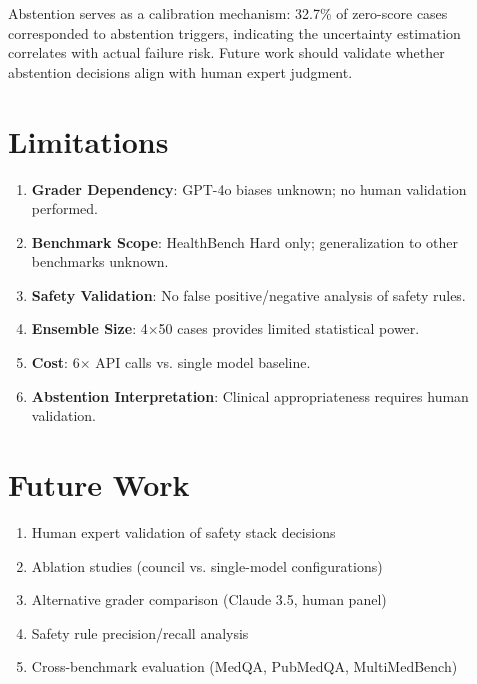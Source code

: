 \documentclass[10pt,twocolumn]{article}
\begin{document}
Abstention serves as a calibration mechanism: 32.7\% of zero-score cases corresponded to abstention triggers, indicating the uncertainty estimation correlates with actual failure risk. Future work should validate whether abstention decisions align with human expert judgment.

\section{Limitations}

\begin{enumerate}
  \item \textbf{Grader Dependency}: GPT-4o biases unknown; no human validation performed.
  \item \textbf{Benchmark Scope}: HealthBench Hard only; generalization to other benchmarks unknown.
  \item \textbf{Safety Validation}: No false positive/negative analysis of safety rules.
  \item \textbf{Ensemble Size}: 4$\times$50 cases provides limited statistical power.
  \item \textbf{Cost}: 6$\times$ API calls vs. single model baseline.
  \item \textbf{Abstention Interpretation}: Clinical appropriateness requires human validation.
\end{enumerate}

\section{Future Work}

\begin{enumerate}
  \item Human expert validation of safety stack decisions
  \item Ablation studies (council vs. single-model configurations)
  \item Alternative grader comparison (Claude 3.5, human panel)
  \item Safety rule precision/recall analysis
  \item Cross-benchmark evaluation (MedQA, PubMedQA, MultiMedBench)
\end{enumerate}
\end{document}
